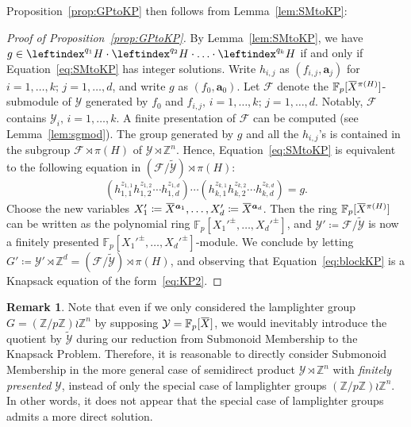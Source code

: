 \documentclass[a4paper,UKenglish,cleveref, autoref, thm-restate]{lipics-v2021}
\newcommand{\Z}{\mathbb{Z}}
\newcommand{\F}{\mathbb{F}}
\newcommand{\mY}{\mathcal{Y}}
\newcommand{\mF}{\mathcal{F}}
\newcommand{\tY}{\widetilde{\mathcal{Y}}}
\newcommand{\ba}{\boldsymbol{a}}
\newcommand{\oX}{\mkern 1.5mu\overline{\mkern-1.5mu X \mkern-1.5mu}\mkern 1.5mu}
\theoremstyle{definition}
\theoremstyle{definition}
\theoremstyle{definition}
\newtheorem{rmk}[thrm]{Remark}
\begin{document}
Proposition~\ref{prop:GPtoKP} then follows from Lemma~\ref{lem:SMtoKP}:
\begin{proof}[Proof of Proposition~\ref{prop:GPtoKP}]
By Lemma~\ref{lem:SMtoKP}, we have $g \in \leftindex^{q_1}{H} \cdot \leftindex^{q_2}{H} \cdot \ldots \cdot \leftindex^{q_{k}}{H}$ if and only if Equation~\eqref{eq:SMtoKP} has integer solutions.
Write $h_{i, j}$ as $(f_{i, j}, \ba_j)$ for $i = 1, \ldots, k; \, j = 1, \ldots, d$, and write $g$ as $(f_0, \ba_0)$.
Let $\mF$ denote the $\F_p[\oX^{\pi(H)}]$-submodule of $\mY$ generated by $f_0$ and $f_{i, j}, \, i = 1, \ldots, k; \, j = 1, \ldots, d$.
Notably, $\mF$ contains $\mY_i, \, i = 1, \ldots, k$.
A finite presentation of $\mF$ can be computed (see Lemma~\ref{lem:sgmod}).
The group generated by $g$ and all the $h_{i, j}$'s is contained in the subgroup $\mF \rtimes \pi(H)$ of $\mY \rtimes \Z^n$.
Hence, Equation~\eqref{eq:SMtoKP} is equivalent to the following equation in $(\mF/\tY) \rtimes \pi(H)$:
\begin{equation}\label{eq:blockKP}
        \left(h_{1,1}^{z_{1, 1}} h_{1,2}^{z_{1, 2}} \cdots h_{1,d}^{z_{1, d}}\right) \cdots \left(h_{k,1}^{z_{k, 1}} h_{k,2}^{z_{k, 2}} \cdots h_{k,d}^{z_{k, d}}\right) = g.
\end{equation}
Choose the new variables $X_1' \coloneqq \oX^{\ba_1}, \ldots, X_d' \coloneqq \oX^{\ba_d}$.
Then the ring $\F_p[\oX^{\pi(H)}]$ can be written as the polynomial ring $\F_p[{X_1'}^{\pm}, \ldots, {X_d'}^{\pm}]$, and $\mY' \coloneqq \mF/\tY$ is now a finitely presented $\F_p[{X_1'}^{\pm}, \ldots, {X_d'}^{\pm}]$-module.
We conclude by letting $G' \coloneqq \mY' \rtimes \Z^d = (\mF/\tY) \rtimes \pi(H)$, and observing that Equation~\eqref{eq:blockKP} is a Knapsack equation of the form~\eqref{eq:KP2}.
\end{proof}

\begin{rmk}\label{rmk:noteasy}
Note that even if we only considered the lamplighter group $G = (\Z/p\Z) \wr \Z^n$ by supposing $\mY = \F_p[\oX]$, we would inevitably introduce the quotient by $\tY$ during our reduction from Submonoid Membership to the Knapsack Problem. Therefore, it is reasonable to directly consider Submonoid Membership in the more general case of semidirect product $\mY \rtimes \Z^n$ with \emph{finitely presented} $\mY$, instead of only the special case of lamplighter groups $(\Z/p\Z) \wr \Z^n$. In other words, it does not appear that the special case of lamplighter groups admits a more direct solution.
\end{rmk}
\end{document}
